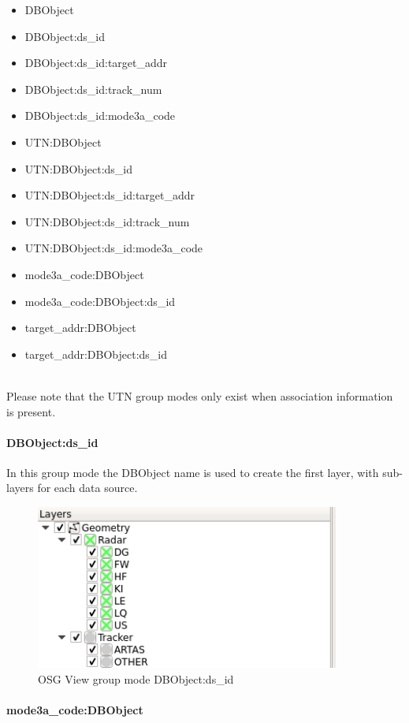 {\begin{itemize}
 \item DBObject
 \item DBObject:ds\_id
 \item DBObject:ds\_id:target\_addr
 \item DBObject:ds\_id:track\_num
 \item DBObject:ds\_id:mode3a\_code
 \item UTN:DBObject
 \item UTN:DBObject:ds\_id
 \item UTN:DBObject:ds\_id:target\_addr
 \item UTN:DBObject:ds\_id:track\_num
 \item UTN:DBObject:ds\_id:mode3a\_code
 \item mode3a\_code:DBObject
 \item mode3a\_code:DBObject:ds\_id
 \item target\_addr:DBObject
 \item target\_addr:DBObject:ds\_id
\end{itemize}
\  \\

Please note that the UTN group modes only exist when association information is present.

\paragraph{DBObject:ds\_id}

In this group mode the DBObject name is used to create the first layer, with sub-layers for each data source.

\begin{figure}[H]
    \includegraphics[width=10cm,frame]{../screenshots/osgview_group_dbo_ds.png}
  \caption{OSG View group mode DBObject:ds\_id}
\end{figure}

\paragraph{mode3a\_code:DBObject}

}
